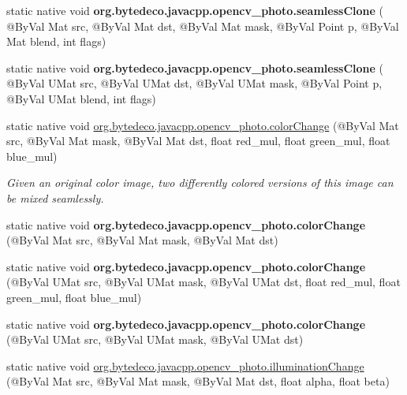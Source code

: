 \begin{DoxyCompactItemize}
\item 
\mbox{\label{group__photo__clone_ga38e8a5ac80ca104670989b92ccd186d0}} 
static native void {\bfseries org.\+bytedeco.\+javacpp.\+opencv\+\_\+photo.\+seamless\+Clone} ( @By\+Val Mat src, @By\+Val Mat dst, @By\+Val Mat mask, @By\+Val Point p, @By\+Val Mat blend, int flags)
\item 
\mbox{\label{group__photo__clone_gaab8f80a1d64b87472f8b1ef27a00f6c3}} 
static native void {\bfseries org.\+bytedeco.\+javacpp.\+opencv\+\_\+photo.\+seamless\+Clone} ( @By\+Val U\+Mat src, @By\+Val U\+Mat dst, @By\+Val U\+Mat mask, @By\+Val Point p, @By\+Val U\+Mat blend, int flags)
\item 
static native void \hyperlink{group__photo__clone_ga3560d162cd540795fe14ae7e98a7a9a2}{org.\+bytedeco.\+javacpp.\+opencv\+\_\+photo.\+color\+Change} (@By\+Val Mat src, @By\+Val Mat mask, @By\+Val Mat dst, float red\+\_\+mul, float green\+\_\+mul, float blue\+\_\+mul)
\begin{DoxyCompactList}\small\item\em Given an original color image, two differently colored versions of this image can be mixed seamlessly. \end{DoxyCompactList}\item 
\mbox{\label{group__photo__clone_gaa4b91919bc9f1d3fb46484378c671177}} 
static native void {\bfseries org.\+bytedeco.\+javacpp.\+opencv\+\_\+photo.\+color\+Change} (@By\+Val Mat src, @By\+Val Mat mask, @By\+Val Mat dst)
\item 
\mbox{\label{group__photo__clone_gad63db0b17e85ef38d4ba96a4a3b7b445}} 
static native void {\bfseries org.\+bytedeco.\+javacpp.\+opencv\+\_\+photo.\+color\+Change} (@By\+Val U\+Mat src, @By\+Val U\+Mat mask, @By\+Val U\+Mat dst, float red\+\_\+mul, float green\+\_\+mul, float blue\+\_\+mul)
\item 
\mbox{\label{group__photo__clone_ga7e00877486ea530a45652426586f47d7}} 
static native void {\bfseries org.\+bytedeco.\+javacpp.\+opencv\+\_\+photo.\+color\+Change} (@By\+Val U\+Mat src, @By\+Val U\+Mat mask, @By\+Val U\+Mat dst)
\item 
static native void \hyperlink{group__photo__clone_gab7df287c3db8bb77269a05cb1e758591}{org.\+bytedeco.\+javacpp.\+opencv\+\_\+photo.\+illumination\+Change} (@By\+Val Mat src, @By\+Val Mat mask, @By\+Val Mat dst, float alpha, float beta)

\end{DoxyCompactItemize}
